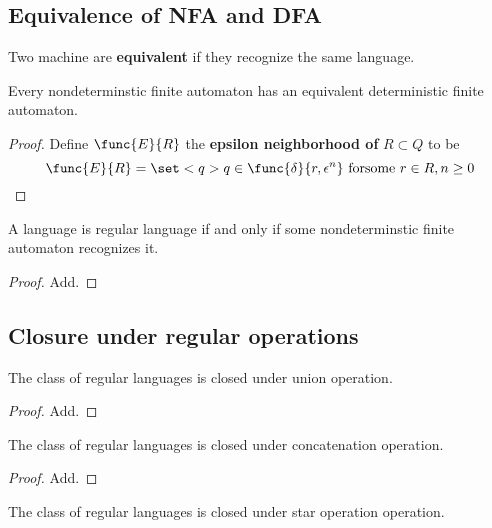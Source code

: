 \subsection{Equivalence of NFA and DFA}
Two machine are \textbf{equivalent} if they recognize the same language.

\begin{theorem}
    Every nondeterminstic finite automaton has an equivalent deterministic finite automaton.
\end{theorem}

\begin{proof}
    Define \(\func{E}{R}\) the \textbf{epsilon neighborhood of} \(R \subset Q\) to be 
    \begin{equation*}
        \func{E}{R} = \set<q>{q \in \func{\delta}{r,\epsilon^n} \ \mathrm{for some} \ r \in R, n \geq 0}
    \end{equation*}
\end{proof}

\begin{corollary}
    A language is regular language if and only if some nondeterminstic finite automaton recognizes it.
\end{corollary}

\begin{proof}
    Add.
\end{proof}

\subsection{Closure under regular operations}

\begin{theorem}
    The class of regular languages is closed under union operation.
\end{theorem}

\begin{proof}
    Add.
\end{proof}

\begin{theorem}
    The class of regular languages is closed under concatenation operation.
\end{theorem}

\begin{proof}
    Add.
\end{proof}

\begin{theorem}
    The class of regular languages is closed under star operation operation.
\end{theorem}

